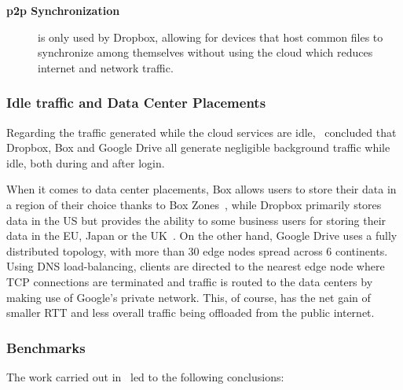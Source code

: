 \begin{description}
    \item[\textbf{\ac{p2p} Synchronization}] is only used by Dropbox, allowing for devices that host common files to synchronize among themselves without using the cloud which reduces internet and network traffic.
\end{description}

\subsubsection{Idle traffic and Data Center Placements}
Regarding the traffic generated while the cloud services are idle,~\cite{personal1} concluded that Dropbox, Box and Google Drive all generate negligible background traffic while idle, both during and after login.

When it comes to data center placements, Box allows users to store their data in a region of their choice thanks to Box Zones~\cite{box}, while Dropbox primarily stores data in the US but provides the ability to some business users for storing their data in the EU, Japan or the UK~\cite{dropbox_data_centers}. On the other hand, Google Drive uses a fully distributed topology, with more than 30 edge nodes spread across 6 continents. Using DNS load-balancing, clients are directed to the nearest edge node where TCP connections are terminated and traffic is routed to the data centers by making use of Google's private network. This, of course, has the net gain of smaller RTT and less overall traffic being offloaded from the public internet.

\subsubsection{Benchmarks}

The work carried out in~\cite{personal1} led to the following conclusions:

